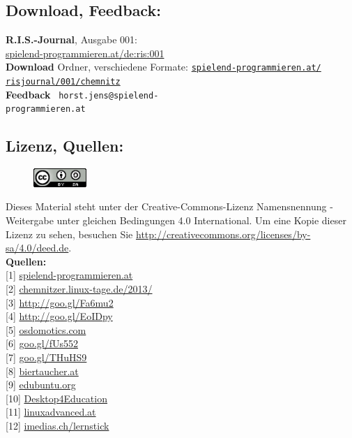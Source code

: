 \subsection*{Download, Feedback:}
\textbf{R.I.S.-Journal}, Ausgabe 001: \\
\href{http://spielend-programmieren.at/de:ris:001}{spielend-programmieren.at/de:ris:001}\\
\textbf{Download} Ordner, verschiedene Formate: \href{http://spielend-programmieren.at/risjournal/001/chemnitz}{\texttt{spielend-programmieren.at/\\risjournal/001/chemnitz}} \\
\textbf{Feedback} \Letter\ \texttt{horst.jens@spielend-\\programmieren.at} \\



\subsection*{Lizenz, Quellen:}
\begin{figure}
\includegraphics[width=2cm]{chemnitz/ccbysa88x31.png}
\end{figure}
Dieses Material steht unter der Creative-Commons-Lizenz Namensnennung - Weitergabe unter gleichen Bedingungen 4.0 International. Um eine Kopie dieser Lizenz zu sehen, besuchen Sie \url{http://creativecommons.org/licenses/by-sa/4.0/deed.de}. \\

\textbf{Quellen:} \\
{[}1{]} \href{http://spielend-programmieren.at}{spielend-programmieren.at} \\
{[}2{]} \href{http://chemnitzer.linux-tage.de/2013/}{chemnitzer.linux-tage.de/2013/} \\
{[}3{]} \href{http://wiki.skolelinux.de/KurtGramlich/Biografie}{http://goo.gl/Fa6mu2} \\
{[}4{]} \href{http://datenkanal.org/archives/14-Interview-mit-Kurt-Gramlich-zu-Skolelinux.html}{http://goo.gl/EoIDpy} \\
{[}5{]} \href{http://osdomotics.com}{osdomotics.com} \\
{[}6{]} \href{http://spielend-programmieren.at/de:sonstiges:alter_blog:2009:0318_chemnitzer_linux-tage_2009}{goo.gl/fUs552} \\
{[}7{]} \href{https://plus.google.com/u/0/112888349007751740309/about}{goo.gl/THuHS9} \\
{[}8{]} \href{http://biertaucher.at}{biertaucher.at} \\
{[}9{]} \href{http://www.edubuntu.org/}{edubuntu.org} \\
{[}10{]} \href{http://d4e.at/}{Desktop4Education} \\
{[}11{]} \href{http://www.linuxadvanced.at/}{linuxadvanced.at} \\
{[}12{]} \href{http://www.imedias.ch/lernstick}{imedias.ch/lernstick} 


